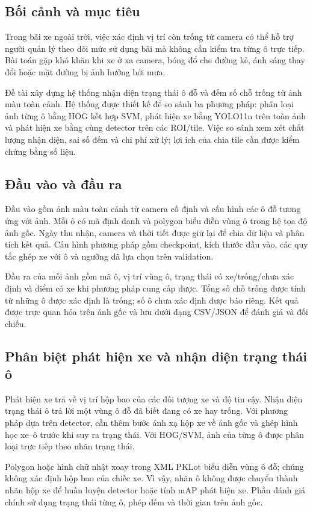 \subsection{Bối cảnh và mục tiêu}
Trong bãi xe ngoài trời, việc xác định vị trí còn trống từ camera có thể hỗ trợ người quản lý theo dõi mức sử dụng bãi mà không cần kiểm tra từng ô trực tiếp. Bài toán gặp khó khăn khi xe ở xa camera, bóng đổ che đường kẻ, ánh sáng thay đổi hoặc mặt đường bị ảnh hưởng bởi mưa.

Đề tài xây dựng hệ thống nhận diện trạng thái ô đỗ và đếm số chỗ trống từ ảnh màu toàn cảnh. Hệ thống được thiết kế để so sánh ba phương pháp: phân loại ảnh từng ô bằng HOG kết hợp SVM, phát hiện xe bằng YOLO11n trên toàn ảnh và phát hiện xe bằng cùng detector trên các ROI/tile. Việc so sánh xem xét chất lượng nhận diện, sai số đếm và chi phí xử lý; lợi ích của chia tile cần được kiểm chứng bằng số liệu.

\subsection{Đầu vào và đầu ra}
Đầu vào gồm ảnh màu toàn cảnh từ camera cố định và cấu hình các ô đỗ tương ứng với ảnh. Mỗi ô có mã định danh và polygon biểu diễn vùng ô trong hệ tọa độ ảnh gốc. Ngày thu nhận, camera và thời tiết được giữ lại để chia dữ liệu và phân tích kết quả. Cấu hình phương pháp gồm checkpoint, kích thước đầu vào, các quy tắc ghép xe với ô và ngưỡng đã lựa chọn trên validation.

Đầu ra của mỗi ảnh gồm mã ô, vị trí vùng ô, trạng thái có xe/trống/chưa xác định và điểm có xe khi phương pháp cung cấp được. Tổng số chỗ trống được tính từ những ô được xác định là trống; số ô chưa xác định được báo riêng. Kết quả được trực quan hóa trên ảnh gốc và lưu dưới dạng CSV/JSON để đánh giá và đối chiếu.

\subsection{Phân biệt phát hiện xe và nhận diện trạng thái ô}
Phát hiện xe trả về vị trí hộp bao của các đối tượng xe và độ tin cậy. Nhận diện trạng thái ô trả lời một vùng ô đỗ đã biết đang có xe hay trống. Với phương pháp dựa trên detector, cần thêm bước ánh xạ hộp xe về ảnh gốc và ghép hình học xe–ô trước khi suy ra trạng thái. Với HOG/SVM, ảnh của từng ô được phân loại trực tiếp theo nhãn trạng thái.

Polygon hoặc hình chữ nhật xoay trong XML PKLot biểu diễn vùng ô đỗ; chúng không xác định hộp bao của chiếc xe. Vì vậy, nhãn ô không được chuyển thành nhãn hộp xe để huấn luyện detector hoặc tính mAP phát hiện xe. Phần đánh giá chính sử dụng trạng thái từng ô, phép đếm và thời gian trên ảnh gốc.

